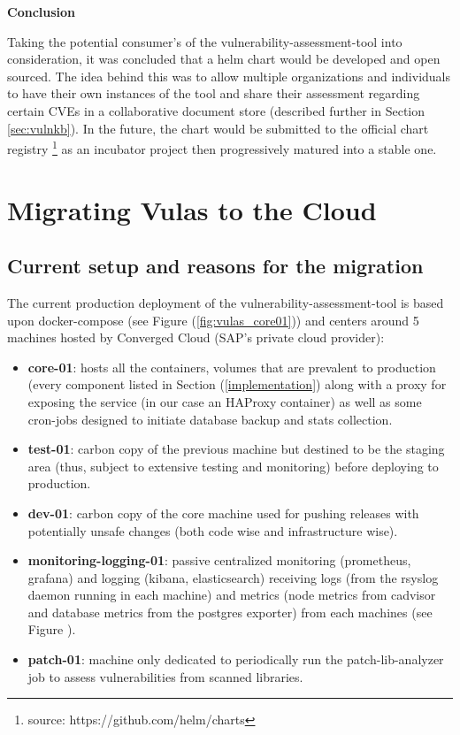 \documentclass[11pt]{article}
\begin{document}
\vspace{3mm}
\textbf{Conclusion}

Taking the potential consumer's of the vulnerability-assessment-tool into consideration, it was concluded that a helm chart would be developed and open sourced. The idea behind this was to allow multiple organizations and individuals to have their own instances of the tool and share their assessment regarding certain CVEs in a collaborative document store (described further in Section \ref{sec:vulnkb}). In the future, the chart would be submitted to the official chart registry \footnote{source: https://github.com/helm/charts} as an incubator project then progressively matured into a stable one.

\newpage
\section{Migrating Vulas to the Cloud}

\subsection{Current setup and reasons for the migration} \label{sec:reason}

\hspace{5mm} The current production deployment of the vulnerability-assessment-tool is based upon docker-compose (see Figure (\ref{fig:vulas_core01})) and centers around 5 machines hosted by Converged Cloud (SAP's private cloud provider):

\begin{itemize}
    \item \textbf{core-01}: hosts all the containers, volumes that are prevalent to production (every component listed in Section (\ref{implementation}) along with a proxy for exposing the service (in our case an HAProxy container) as well as some cron-jobs designed to initiate database backup and stats collection.
    \item \textbf{test-01}: carbon copy of the previous machine but destined to be the staging area (thus, subject to extensive testing and monitoring) before deploying to production.
    \item \textbf{dev-01}: carbon copy of the core machine used for pushing releases with potentially unsafe changes (both code wise and infrastructure wise). 
    \item \textbf{monitoring-logging-01}: passive centralized monitoring (prometheus, grafana) and logging (kibana, elasticsearch) receiving logs (from the rsyslog daemon running in each machine) and metrics (node metrics from cadvisor and database metrics from the postgres exporter) from each machines (see Figure ).
    \item \textbf{patch-01}: machine only dedicated to periodically run the patch-lib-analyzer job to assess vulnerabilities from scanned libraries.
\end{itemize}
\end{document}
